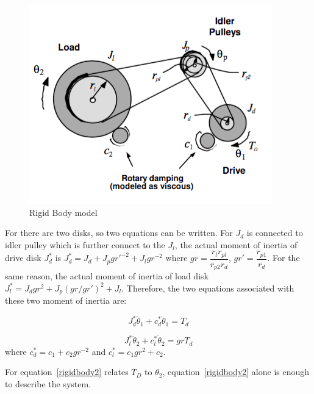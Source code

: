 \documentclass[a4paper, 12pt]{article}
\begin{document}
\begin{figure}[!htbp]
\centering
\includegraphics[scale = 0.7]{RigidBody}
\caption{Rigid Body model}
\label{rigidbody}
\end{figure}

For there are two disks, so two equations can be written. For $J_d$ is connected to idler pulley which is further connect to the $J_l$, the actual moment of inertia of drive disk $J_d^*$ is $J_d^* = J_d + J_p gr'^{-2} + J_lgr^{-2}$ where $gr = \dfrac{r_l r_{pl}}{r_{p2}r_d}$, $gr' = \dfrac{r_{p1}}{r_d}$. For the same reason, the actual moment of inertia of load disk $J_l^* = J_d gr^2 + J_p (gr/gr')^2 + J_l$. Therefore, the two equations associated with these two moment of inertia are: 

\begin{equation} \label{rigidbody1}
J_d^* \ddot{\theta}_1 + c_d^* \dot{\theta}_1 = T_d
\end{equation}

\begin{equation} \label{rigidbody2}
J_l^* \ddot{\theta}_2 + c_l^*\dot{\theta}_2 = gr T_d
\end{equation}
where $c_d^* = c_1 + c_2gr^{-2}$ and $c_l^* = c_1gr^2 + c_2$.

For equation~\ref{rigidbody2} relates $T_D$ to $\theta_2$, equation~\ref{rigidbody2} alone is enough to describe the system. 
\end{document}
